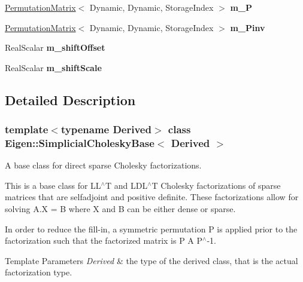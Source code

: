 \begin{DoxyCompactItemize}
\mbox{\hyperlink{class_eigen_1_1_permutation_matrix}{Permutation\+Matrix}}$<$ Dynamic, Dynamic, Storage\+Index $>$ {\bfseries m\+\_\+P}
\item 
\mbox{\label{class_eigen_1_1_simplicial_cholesky_base_acf66317d71c11d41dcb922448c9384b7}} 
\mbox{\hyperlink{class_eigen_1_1_permutation_matrix}{Permutation\+Matrix}}$<$ Dynamic, Dynamic, Storage\+Index $>$ {\bfseries m\+\_\+\+Pinv}
\item 
\mbox{\label{class_eigen_1_1_simplicial_cholesky_base_a4e9e1aad9de3b3a66df7104d120a4331}} 
Real\+Scalar {\bfseries m\+\_\+shift\+Offset}
\item 
\mbox{\label{class_eigen_1_1_simplicial_cholesky_base_ae7c80217fb99177ef501b19f75df6942}} 
Real\+Scalar {\bfseries m\+\_\+shift\+Scale}
\end{DoxyCompactItemize}


\subsection{Detailed Description}
\subsubsection*{template$<$typename Derived$>$\newline
class Eigen\+::\+Simplicial\+Cholesky\+Base$<$ Derived $>$}

A base class for direct sparse Cholesky factorizations. 

This is a base class for L\+L$^\wedge$T and L\+D\+L$^\wedge$T Cholesky factorizations of sparse matrices that are selfadjoint and positive definite. These factorizations allow for solving A.\+X = B where X and B can be either dense or sparse.

In order to reduce the fill-\/in, a symmetric permutation P is applied prior to the factorization such that the factorized matrix is P A P$^\wedge$-\/1.


\begin{DoxyTemplParams}{Template Parameters}
{\em Derived} & the type of the derived class, that is the actual factorization type. \\
\hline
\end{DoxyTemplParams}


